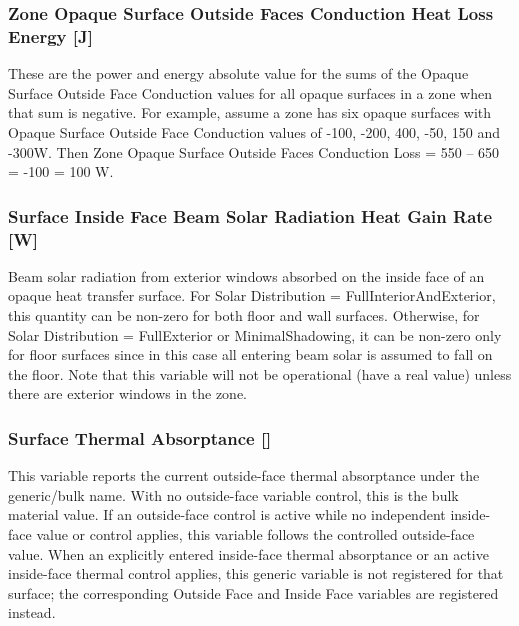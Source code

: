 \subsubsection{Zone Opaque Surface Outside Faces Conduction Heat Loss Energy {[}J{]}}\label{zone-opaque-surface-outside-face-conduction-loss-energy-j}

These are the power and energy absolute value for the sums of the Opaque Surface Outside Face Conduction values for all opaque surfaces in a zone when that sum is negative. For example, assume a zone has six opaque surfaces with Opaque Surface Outside Face Conduction values of -100, -200, 400, -50, 150 and -300W. Then Zone Opaque Surface Outside Faces Conduction Loss = \textbar{}550 -- 650\textbar{} = \textbar{}-100\textbar{} = 100 W.

\subsubsection{Surface Inside Face Beam Solar Radiation Heat Gain Rate {[}W{]}}\label{surface-inside-face-beam-solar-radiation-heat-gain-rate-w}

Beam solar radiation from exterior windows absorbed on the inside face of an opaque heat transfer surface. For Solar Distribution = FullInteriorAndExterior, this quantity can be non-zero for both floor and wall surfaces. Otherwise, for Solar Distribution = FullExterior or MinimalShadowing, it can be non-zero only for floor surfaces since in this case all entering beam solar is assumed to fall on the floor. Note that this variable will not be operational (have a real value) unless there are exterior windows in the zone.

\subsubsection{Surface Thermal Absorptance {[}{]}}\label{surface-thermal-absorptance}

This variable reports the current outside-face thermal absorptance under the generic/bulk name. With no outside-face variable control, this is the bulk material value. If an outside-face control is active while no independent inside-face value or control applies, this variable follows the controlled outside-face value. When an explicitly entered inside-face thermal absorptance or an active inside-face thermal control applies, this generic variable is not registered for that surface; the corresponding Outside Face and Inside Face variables are registered instead.

